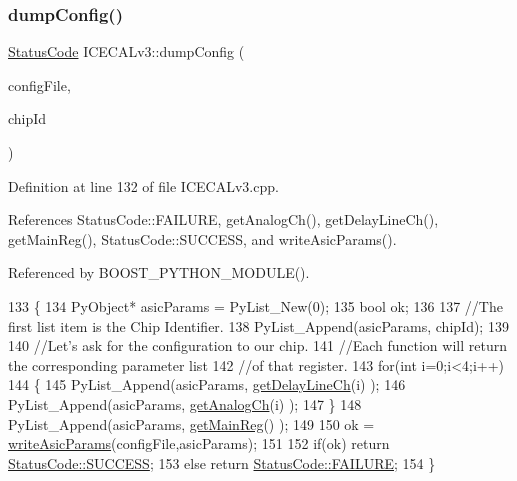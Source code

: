 \subsubsection{\texorpdfstring{dump\+Config()}{dumpConfig()}}
{\footnotesize\ttfamily \hyperlink{classStatusCode}{Status\+Code} I\+C\+E\+C\+A\+Lv3\+::dump\+Config (\begin{DoxyParamCaption}\item[{string}]{config\+File,  }\item[{Py\+Object $\ast$}]{chip\+Id }\end{DoxyParamCaption})}



Definition at line 132 of file I\+C\+E\+C\+A\+Lv3.\+cpp.



References Status\+Code\+::\+F\+A\+I\+L\+U\+RE, get\+Analog\+Ch(), get\+Delay\+Line\+Ch(), get\+Main\+Reg(), Status\+Code\+::\+S\+U\+C\+C\+E\+SS, and write\+Asic\+Params().



Referenced by B\+O\+O\+S\+T\+\_\+\+P\+Y\+T\+H\+O\+N\+\_\+\+M\+O\+D\+U\+L\+E().


\begin{DoxyCode}
133 \{
134     PyObject* asicParams = PyList\_New(0);
135     \textcolor{keywordtype}{bool} ok;
136 
137     \textcolor{comment}{//The first list item is the Chip Identifier.}
138     PyList\_Append(asicParams, chipId);
139 
140     \textcolor{comment}{//Let's ask for the configuration to our chip.}
141     \textcolor{comment}{//Each function will return the corresponding parameter list}
142     \textcolor{comment}{//of that register.}
143     \textcolor{keywordflow}{for}(\textcolor{keywordtype}{int} i=0;i<4;i++)
144     \{
145         PyList\_Append(asicParams, \hyperlink{classICECALv3_a7a1c1706a455903f42bb9a5257d94a78}{getDelayLineCh}(i) );
146         PyList\_Append(asicParams, \hyperlink{classICECALv3_a5f1414e6049a82eafdd505a88d7d0c91}{getAnalogCh}(i) );
147     \}
148     PyList\_Append(asicParams, \hyperlink{classICECALv3_a4a414d23c1e199b446dc876161338148}{getMainReg}() );
149 
150     ok = \hyperlink{classICECALv3_a9d7c33e6d113e7f721dc848d28ab44d8}{writeAsicParams}(configFile,asicParams);
151 
152     \textcolor{keywordflow}{if}(ok) \textcolor{keywordflow}{return} \hyperlink{classStatusCode_a6f565cbeadc76d14c72f047e5e85eb4badd0da38d3ba0d922efd1f4619bc37ad8}{StatusCode::SUCCESS};
153     \textcolor{keywordflow}{else}   \textcolor{keywordflow}{return} \hyperlink{classStatusCode_a6f565cbeadc76d14c72f047e5e85eb4ba3da73d4c469762eb9d3c960368252b26}{StatusCode::FAILURE};
154 \}
\end{DoxyCode}
\mbox{\label{classICECALv3_ac006abc42a048308427f6801d783a407}} 
